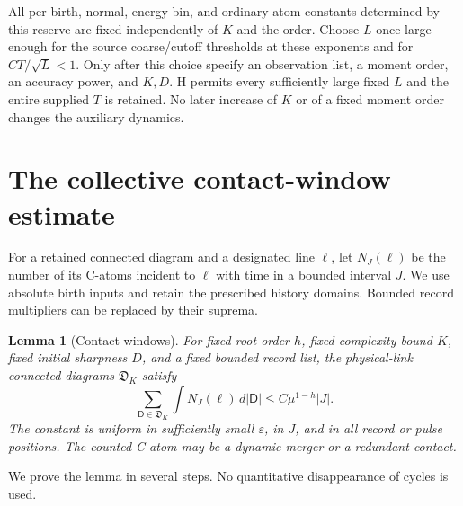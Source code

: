 \documentclass[11pt]{article}
\newcommand{\eps}{\varepsilon}
\newcommand{\dd}{\,d}
\newtheorem{lemma}[theorem]{Lemma}
\theoremstyle{definition}\newtheorem{definition}[theorem]{Definition}
\theoremstyle{remark}\newtheorem{remark}[theorem]{Remark}
\numberwithin{equation}{section}
\begin{document}
All per-birth, normal, energy-bin, and ordinary-atom constants determined by
this reserve are fixed independently of $K$ and the order. Choose $L$ once
large enough for the source coarse/cutoff thresholds at these exponents
and for $CT/\sqrt L<1$. Only after this choice specify an observation list,
a moment order, an accuracy power, and $K,D$. H permits every sufficiently
large fixed $L$ and the entire supplied $T$ is retained. No later increase
of $K$ or of a fixed moment order changes the auxiliary dynamics.

\section{The collective contact-window estimate}\label{sec:window}
For a retained connected diagram and a designated line $\ell$, let
$N_J(\ell)$ be the number of its C-atoms incident to $\ell$ with time in a
bounded interval $J$. We use absolute birth inputs and retain the prescribed
history domains. Bounded record multipliers can be replaced by their
suprema.

\begin{lemma}[Contact windows]\label{lem:window}
For fixed root order $h$, fixed complexity bound $K$, fixed initial sharpness
$D$, and a fixed bounded record list, the physical-link connected diagrams
$\mathfrak D_K$ satisfy
\begin{equation}\label{eq:window}
 \sum_{\mathsf D\in\mathfrak D_K}\int N_J(\ell)\dd|\mathsf D|
        \le C\mu^{1-h}|J|.
\end{equation}
The constant is uniform in sufficiently small $\eps$, in $J$, and in all
record or pulse positions. The counted C-atom may be a dynamic merger or a
redundant contact.
\end{lemma}
We prove the lemma in several steps. No quantitative disappearance of cycles
is used.
\end{document}
